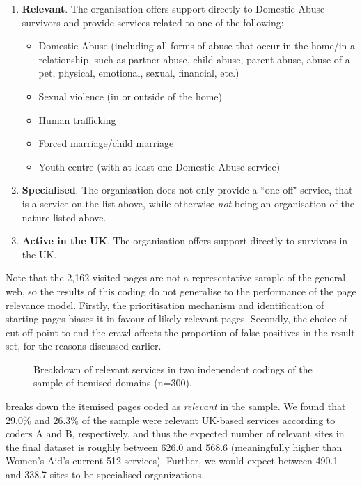 \documentclass[conference]{IEEEtran}
\begin{document}
\begin{enumerate}
    \item \textbf{Relevant}. The organisation offers support directly to Domestic Abuse survivors and provide services related to one of the following:
        \begin{itemize}
            \item Domestic Abuse (including all forms of abuse that occur in the home/in a relationship, such as partner abuse, child abuse, parent abuse, abuse of a pet, physical, emotional, sexual, financial, etc.)
            \item Sexual violence (in or outside of the home) 
            \item Human trafficking 
            \item Forced marriage/child marriage 
            \item Youth centre (with at least one Domestic Abuse service) 
        \end{itemize}
    \item \textbf{Specialised}. The organisation does not only provide a ``one-off" service, that is a service on the list above, while otherwise \textit{not} being an organisation of the nature listed above.
    \item \textbf{Active in the UK}. The organisation offers support directly to survivors in the UK.
\end{enumerate}

Note that the 2,162 visited pages are not a representative sample of the general web, so the results of this coding do not generalise to the performance of the page relevance model.
Firstly, the prioritisation mechanism and identification of starting pages biases it in favour of likely relevant pages.
Secondly, the choice of cut-off point to end the crawl affects the proportion of false positives in the result set, for the reasons discussed earlier.

\begin{figure}
    \centering
    \resizebox{8cm}{!}{}
    \caption{Breakdown of relevant services in two independent codings of the sample of itemised domains (n=300).}
    \label{fig:coding}
\end{figure}

 breaks down the itemised pages coded as \textit{relevant} in the sample. 
We found that 29.0\% and 26.3\% of the sample were relevant UK-based services according to coders A and B, respectively, and thus the expected number of relevant sites in the final dataset is roughly between 626.0 and 568.6 (meaningfully higher than Women's Aid's current 512 services). Further, we would expect between 490.1 and 338.7 sites to be specialised organizations.
\end{document}
